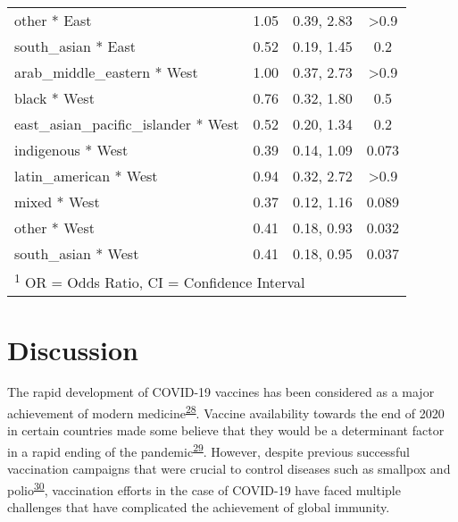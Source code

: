 \documentclass[
  letterpaper,
  DIV=11,
  numbers=noendperiod]{scrartcl}
\begin{document}
\begin{longtable}{lccc}
\hspace{1em}other * East & 1.05 & 0.39, 2.83 & >0.9\\
\hspace{1em}south\_asian * East & 0.52 & 0.19, 1.45 & 0.2\\
\hspace{1em}arab\_middle\_eastern * West & 1.00 & 0.37, 2.73 & >0.9\\
\hspace{1em}black * West & 0.76 & 0.32, 1.80 & 0.5\\
\hspace{1em}east\_asian\_pacific\_islander * West & 0.52 & 0.20, 1.34 & 0.2\\
\hspace{1em}indigenous * West & 0.39 & 0.14, 1.09 & 0.073\\
\hspace{1em}latin\_american * West & 0.94 & 0.32, 2.72 & >0.9\\
\hspace{1em}mixed * West & 0.37 & 0.12, 1.16 & 0.089\\
\hspace{1em}other * West & 0.41 & 0.18, 0.93 & 0.032\\
\hspace{1em}south\_asian * West & 0.41 & 0.18, 0.95 & 0.037\\*
\multicolumn{4}{l}{\rule{0pt}{1em}\textsuperscript{1} OR = Odds Ratio, CI = Confidence Interval}\\
\end{longtable}

\normalsize

\hypertarget{discussion}{%
\section{Discussion}\label{discussion}}

The rapid development of COVID-19 vaccines has been considered as a
major achievement of modern
medicine\textsuperscript{\protect\hyperlink{ref-davis2022}{28}}. Vaccine
availability towards the end of 2020 in certain countries made some
believe that they would be a determinant factor in a rapid ending of the
pandemic\textsuperscript{\protect\hyperlink{ref-thelancet2021}{29}}.
However, despite previous successful vaccination campaigns that were
crucial to control diseases such as smallpox and
polio\textsuperscript{\protect\hyperlink{ref-kayser2021}{30}},
vaccination efforts in the case of COVID-19 have faced multiple
challenges that have complicated the achievement of global immunity.
\end{document}
